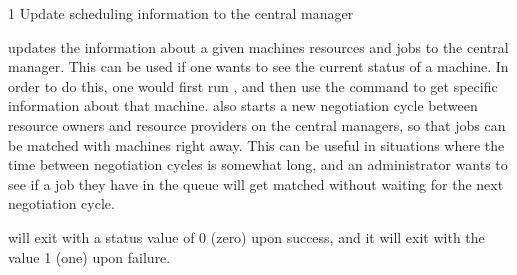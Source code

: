 \begin{ManPage}{\label{man-condor-reschedule}}{1}
{Update scheduling information to the central manager}

\Synopsis {}
\ToolArgs


\Description 

 updates the information about a given machines resources
and jobs to the central manager.  This can be used if one wants to see the
current status of a machine.  In order to do this, one would first run
, and then use the  command to get 
specific information about that machine.   also
starts a new negotiation cycle between resource owners and resource providers
on the central managers, so that jobs can be matched with machines right
away.  This can be useful in situations where the time between negotiation
cycles is somewhat long, and an administrator wants to see if a job they have
in the queue will get matched without waiting for the next negotiation cycle.

\begin{Options}
	\ToolArgsDesc
\end{Options}

\ExitStatus

 will exit with a status value of 0 (zero) upon success,
and it will exit with the value 1 (one) upon failure.

\end{ManPage}
